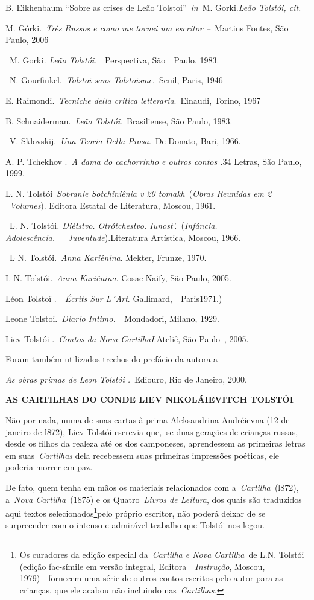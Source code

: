 B. Eikhenbaum ``Sobre as crises de Leão Tolstoi''~\emph{in~}M.
Gorki.\emph{Leão Tolstói, cit.}

M. Górki.~\emph{Três Russos e como me tornei um escritor --~}Martins
Fontes, São Paulo, 2006

~M. Gorki\emph{. Leão Tolstói}.~~Perspectiva, São~~Paulo, 1983.

~N. Gourfinkel.~\emph{Tolstoï sans Tolstoïsme}.~Seuil, Paris, 1946

E. Raimondi.~\emph{Tecniche della critica letteraria}.~Einaudi, Torino,
1967

B. Schnaiderman.~\emph{Leão Tolstói}.~Brasiliense, São Paulo, 1983.

~V. Sklovskij.~\emph{Una Teoria Della Prosa}.~De Donato, Bari, 1966.

A. P. Tchekhov .~\emph{A dama do cachorrinho e outros contos .}34
Letras, São Paulo, 1999.

L. N. Tolstói~\emph{Sobranie Sotchiniênia v 20 tomakh}~(\emph{Obras
Reunidas em 2 ~Volumes}). Editora Estatal de Literatura, Moscou, 1961.

~L. N. Tolstói\emph{. Diétstvo. Otrótchestvo. Iunost'.}~(\emph{Infância.
Adolescência.~~~Juventude}).Literatura Artística, Moscou, 1966.

~L N. Tolstói.~\emph{Anna Kariênina}. Mekter, Frunze, 1970.

L N. Tolstói.~\emph{Anna Kariênina}. Cosac Naify, São Paulo, 2005.

Léon Tolstoï .~\emph{~Écrits Sur L´Art}. Gallimard,~~Paris1971.)

Leone Tolstoi.~\emph{Diario Intimo.~}~Mondadori, Milano, 1929.

Liev Tolstói .~\emph{Contos da Nova CartilhaI}.Ateliê, São Paulo~,
2005.~

Foram também utilizados trechos do prefácio da autora a

\emph{As obras primas de Leon Tolstói .~}Ediouro, Rio de Janeiro, 2000.

\textbf{AS CARTILHAS DO CONDE LIEV NIKOLÁIEVITCH TOLSTÓI}

Não por nada, numa de suas cartas à prima Aleksandrina Andréievna (12 de
janeiro de l872), Liev Tolstói escrevia que,\textbf{~}se duas gerações
de crianças russas, desde os filhos da realeza até os dos camponeses,
aprendessem as primeiras letras em suas~\emph{Cartilhas} dela recebessem
suas primeiras impressões poéticas, ele poderia morrer em paz.

De fato, quem tenha em mãos os materiais relacionados com
a~\emph{Cartilha~}(l872), a~\emph{Nova Cartilha~}(1875) e os
Quatro~\emph{Livros de Leitura}, dos quais são traduzidos aqui textos
selecionados\footnote{Os curadores da edição especial da~\emph{Cartilha
  e Nova Cartilha~}de L.N. Tolstói (edição fac-símile em versão
  integral, Editora~~\emph{Instrução}, Moscou, 1979)~~fornecem uma série
  de outros contos escritos pelo autor para as crianças, que ele acabou
  não incluindo nas~\emph{Cartilhas.}}pelo próprio escritor, não poderá
deixar de se surpreender com o intenso e admirável trabalho que Tolstói
nos legou.

